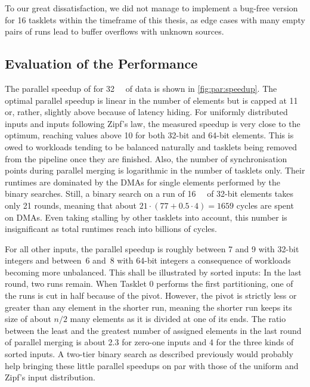 To our great dissatisfaction, we did not manage to implement a bug-free version for 16 tasklets within the timeframe of this thesis, as edge cases with many empty pairs of runs lead to buffer overflows with unknown sources.



\subsection{Evaluation of the Performance}

The parallel speedup of \MS{} for \qty{32}{\mebi\byte} of data is shown in \cref{fig:par:speedup}.
The optimal parallel speedup is linear in the number of elements but is capped at 11 or, rather, slightly above because of latency hiding.
For uniformly distributed inputs and inputs following Zipf's law, the measured speedup is very close to the optimum, reaching values above 10 for both 32-bit and 64-bit elements.
This is owed to workloads tending to be balanced naturally and tasklets being removed from the pipeline once they are finished.
Also, the number of synchronisation points during parallel merging is logarithmic in the number of tasklets only.
Their runtimes are dominated by the DMAs for single elements performed by the binary searches.
Still, a binary search on a run of \qty{16}{\mebi\byte} of 32-bit elements takes only 21 rounds, meaning that about \(21 \cdot (77 + 0.5 \cdot 4) = 1659\) cycles are spent on DMAs.
Even taking stalling by other tasklets into account, this number is insignificant as total runtimes reach into billions of cycles.

For all other inputs, the parallel speedup is roughly between 7 and 9 with 32-bit integers and between~6 and~8 with 64-bit integers \Dash a consequence of workloads becoming more unbalanced.
This shall be illustrated by sorted inputs:
In the last round, two runs remain.
When Tasklet 0 performs the first partitioning, one of the runs is cut in half because of the pivot.
However, the pivot is strictly less or greater than any element in the shorter run, meaning the shorter run keeps its size of about \(n/2\) many elements as it is divided at one of its ends.
The ratio between the least and the greatest number of assigned elements in the last round of parallel merging is about 2.3 for zero-one inputs and 4 for the three kinds of sorted inputs.
A two-tier binary search as described previously would probably help bringing these little parallel speedups on par with those of the uniform and Zipf's input distribution.


